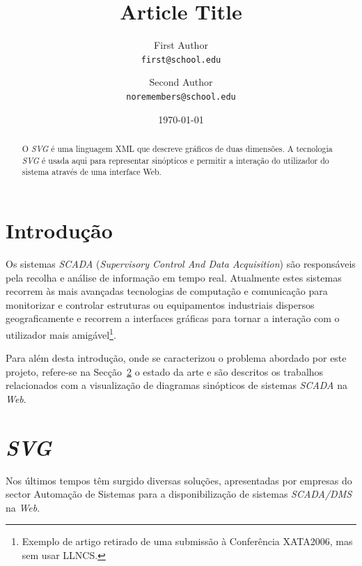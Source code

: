 \documentclass[twocolumn,twoside,11pt,a4paper]{article}
\title{\vspace{-15mm}\fontsize{24pt}{10pt}\selectfont\textbf{Article Title}} %
\author{First Author\\
\small \texttt{first@school.edu}\\
\and
Second Author\\
\small \texttt{noremembers@school.edu}
\vspace{-5mm}
}
\date{\today}
\newcommand{\class}[1]{{\normalfont\slshape #1\/}}
\newcommand{\svg}{\class{SVG}}
\newcommand{\scada}{\class{SCADA}}
\newcommand{\scadadms}{\class{SCADA/DMS}}
\begin{document}
\maketitle
\thispagestyle{plain}            %


\begin{abstract}
O \svg{} é uma linguagem XML que descreve gráficos de duas dimensões.
A tecnologia \svg{} é usada aqui para representar sinópticos e
permitir a interação do utilizador do sistema através de uma
interface Web.  \lipsum[1]
\end{abstract}


\section{Introdução}\label{sec:intro}

Os sistemas \scada{} (\emph{Supervisory Control And Data Acquisition})
são responsáveis pela recolha e análise de informação em tempo real.
Atualmente estes sistemas recorrem às mais avançadas tecnologias de
computação e comunicação para monitorizar e controlar estruturas ou
equipamentos industriais dispersos geograficamente e recorrem a
interfaces gráficas para tornar a interação com o utilizador mais
amigável\footnote{Exemplo de artigo retirado de uma submissão à
  Conferência XATA2006, mas sem usar LLNCS.}.

\lipsum[2]

Para além desta introdução, onde se caracterizou o problema abordado
por este projeto, refere-se na Secção~\ref{sec:sota} o
estado da arte e são descritos os trabalhos relacionados com a
visualização de diagramas sinópticos de sistemas \scada{} na
\textit{Web}. 


\section{\svg}\label{sec:sota}

Nos últimos tempos têm surgido diversas soluções, apresentadas por
empresas do sector Automação de Sistemas para a disponibilização de
sistemas \scadadms{} na \textit{Web}.
\end{document}
